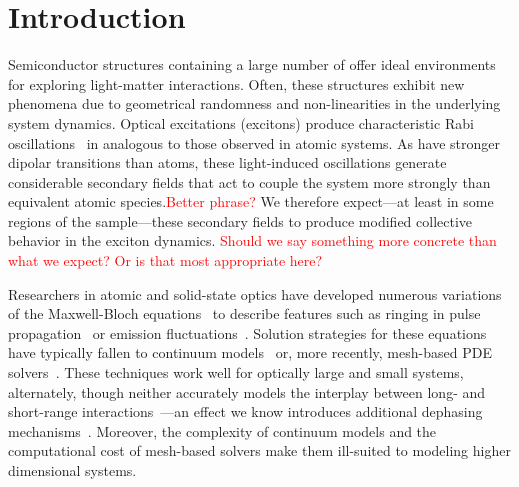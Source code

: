 \section{\label{section:introduction}Introduction}

Semiconductor structures containing a large number of \qds{} offer ideal environments for exploring light-matter interactions.
Often, these structures exhibit new phenomena due to geometrical randomness and non-linearities in the underlying system dynamics.
Optical excitations (excitons) produce characteristic Rabi oscillations~\cite{Stievater2001,Kamada2001,Htoon2002} in \qds{} analogous to those observed in atomic systems.
As \qds{} have stronger dipolar transitions than atoms, these light-induced oscillations generate considerable secondary fields that act to couple the system more strongly than equivalent atomic species.\textcolor{red}{Better phrase?}
We therefore expect---at least in some regions of the sample---these secondary fields to produce modified collective behavior in the exciton dynamics.
\textcolor{red}{Should we say something more concrete than what we expect? Or is that most appropriate here?}

Researchers in atomic and solid-state optics have developed numerous variations of the Maxwell-Bloch equations~\cite{Gross1982} to describe features such as ringing in pulse propagation~\cite{Burnham1969,MacGillivray1976} or emission fluctuations~\cite{Haake1979}.
Solution strategies for these equations have typically fallen to continuum models~\cite{Rehler1971,MacGillivray1976} or, more recently, mesh-based PDE solvers~\cite{Vanneste2001,Fratalocchi2008,Jiang2000,Andreasen2009,Bachelard2015}.
These techniques work well for optically large and small systems, alternately, though neither accurately models the interplay between long- and short-range interactions~\cite{Baczewski2013}---an effect we know introduces additional dephasing mechanisms~\cite{Coffey1978}.
Moreover, the complexity of continuum models and the computational cost of mesh-based solvers make them ill-suited to modeling higher dimensional systems.


